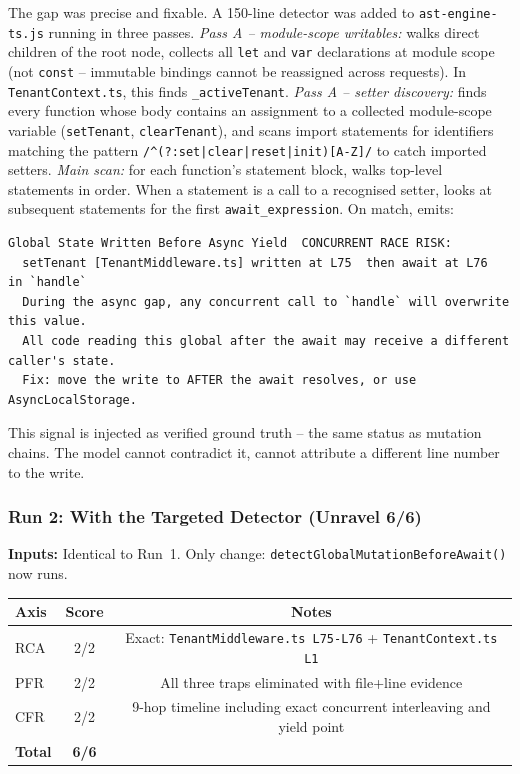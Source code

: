 \documentclass[12pt,a4paper]{article}
\newcommand{\code}[1]{\texttt{\small #1}}
\begin{document}
The gap was precise and fixable. A 150-line detector was added to \code{ast-engine-ts.js}
running in three passes. \textit{Pass A -- module-scope writables:} walks direct children
of the root node, collects all \code{let} and \code{var} declarations at module scope
(not \code{const} -- immutable bindings cannot be reassigned across requests). In
\code{TenantContext.ts}, this finds \code{\_activeTenant}. \textit{Pass A -- setter
discovery:} finds every function whose body contains an assignment to a collected
module-scope variable (\code{setTenant}, \code{clearTenant}), and scans import statements
for identifiers matching the pattern \code{/\^{}(?:set|clear|reset|init)[A-Z]/} to catch
imported setters. \textit{Main scan:} for each function's statement block, walks
top-level statements in order. When a statement is a call to a recognised setter, looks
at subsequent statements for the first \code{await\_expression}. On match, emits:
\begin{lstlisting}[language={},style=code]
Global State Written Before Async Yield  CONCURRENT RACE RISK:
  setTenant [TenantMiddleware.ts] written at L75  then await at L76  in `handle`
  During the async gap, any concurrent call to `handle` will overwrite this value.
  All code reading this global after the await may receive a different caller's state.
  Fix: move the write to AFTER the await resolves, or use AsyncLocalStorage.
\end{lstlisting}
This signal is injected as verified ground truth -- the same status as mutation chains.
The model cannot contradict it, cannot attribute a different line number to the write.

\subsubsection{Run 2: With the Targeted Detector (Unravel 6/6)}
\label{sec:superbug-run2}

\textbf{Inputs:} Identical to Run~1. Only change: \code{detectGlobalMutationBeforeAwait()} now runs.

\begin{center}\small
\begin{tabular}{@{}lcc@{}}
\toprule
\textbf{Axis} & \textbf{Score} & \textbf{Notes} \\
\midrule
RCA & 2/2 & Exact: \code{TenantMiddleware.ts L75-L76} + \code{TenantContext.ts L1} \\
PFR & 2/2 & All three traps eliminated with file+line evidence \\
CFR & 2/2 & 9-hop timeline including exact concurrent interleaving and yield point \\
\midrule
\textbf{Total} & \textbf{6/6} & \\
\bottomrule
\end{tabular}
\end{center}
\end{document}
